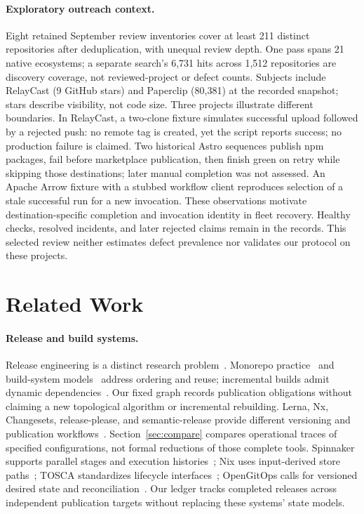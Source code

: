 \paragraph{Exploratory outreach context.}
Eight retained September review inventories cover at least 211 distinct
repositories after deduplication, with unequal review depth. One pass spans
21 native ecosystems; a separate search's 6,731 hits across 1,512 repositories
are discovery coverage, not reviewed-project or defect counts.
Subjects include RelayCast (9 GitHub stars) and Paperclip (80,381) at the
recorded snapshot; stars describe visibility, not code size.
Three projects illustrate different boundaries. In RelayCast, a two-clone
fixture simulates successful upload followed by a rejected push: no remote tag
is created, yet the script reports success; no production failure is claimed.
Two historical Astro sequences publish npm packages, fail before marketplace
publication, then finish green on retry while skipping those destinations;
later manual completion was not assessed. An Apache Arrow fixture with a
stubbed workflow client reproduces selection of a stale successful run for a
new invocation. These observations motivate destination-specific completion
and invocation identity in fleet recovery. Healthy checks, resolved incidents,
and later rejected claims remain in the records. This selected review neither
estimates defect prevalence nor validates our protocol on these projects.

\section{Related Work}
\label{sec:related}
\paragraph{Release and build systems.}
Release engineering is a distinct research problem~\cite{adams}.
Monorepo practice~\cite{potvin} and build-system models~\cite{mokhov} address
ordering and reuse; incremental builds admit dynamic dependencies~\cite{pluto}.
Our fixed graph records publication obligations without claiming a new
topological algorithm or incremental rebuilding.
Lerna, Nx, Changesets, release-please, and semantic-release provide different
versioning and publication workflows~\cite{lerna,nx,changesets,releaseplease,
semanticrelease}. Section~\ref{sec:compare} compares operational traces of
specified configurations, not formal reductions of those complete tools.
Spinnaker supports parallel stages and execution histories~\cite{spinnaker};
Nix uses input-derived store paths~\cite{nix}; TOSCA standardizes lifecycle
interfaces~\cite{tosca}; OpenGitOps calls for versioned desired state and
reconciliation~\cite{gitops}. Our ledger tracks completed releases across
independent publication targets without replacing these systems' state models.

